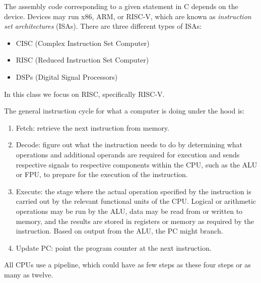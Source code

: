 The assembly code corresponding to a given statement in
C depends on the device. Devices may run x86, ARM, or RISC-V,
which are known as \emph{instruction set architectures} (ISAs).
There are three different types of ISAs:
\begin{itemize}
    \item CISC (Complex Instruction Set Computer)
    \item RISC (Reduced Instruction Set Computer)
    \item DSPs (Digital Signal Processors)
\end{itemize}
In this class we focus on RISC, specifically RISC-V.

The general instruction cycle for what a computer is doing under the
hood is:
\begin{enumerate}
    \item Fetch: retrieve the next instruction from memory.
    \item Decode: figure out what the instruction needs to do
          by determining what operations and additional operands
          are required for execution and sends respective signals
          to respective components within the CPU, such as the ALU
          or FPU, to prepare for the execution of the instruction.
    \item Execute: the stage where the actual operation
          specified by the instruction is carried out by the relevant
          functional units of the CPU. Logical or arithmetic operations
          may be run by the ALU, data may be read from or written to
          memory, and the results are stored in registers or memory as
          required by the instruction. Based on output from the ALU,
          the PC might branch.
    \item Update PC: point the program counter at the next instruction.
\end{enumerate}
All CPUs use a pipeline, which could have as few steps as these four
steps or as many as twelve.